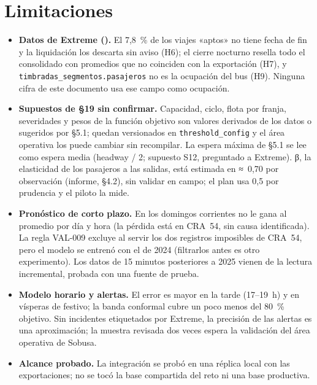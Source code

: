 \documentclass[10pt,a4paper]{article}
\begin{document}
\section{Limitaciones}
\begin{itemize}
\item \textbf{Datos de Extreme (\HallazgosRango).} El 7,8~\% de los viajes «aptos» no tiene fecha de fin y la liquidación los
  descarta sin aviso (H6); el cierre nocturno resella todo el consolidado con promedios que no coinciden con la
  exportación (H7), y \texttt{timbradas\_segmentos.pasajeros} no es la ocupación del bus (H9). Ninguna cifra de este
  documento usa ese campo como ocupación.
\item \textbf{Supuestos de §19 sin confirmar.} Capacidad, ciclo, flota por franja, severidades y pesos de la función
  objetivo son valores derivados de los datos o sugeridos por §5.1; quedan versionados en \texttt{threshold\_config} y
  el área operativa los puede cambiar sin recompilar. La espera máxima de §5.1 se lee como espera media (headway / 2;
  supuesto S12, preguntado a Extreme). β, la elasticidad de los pasajeros a las salidas, está estimada en ≈~0,70 por observación (informe, §4.2),
  sin validar en campo; el plan usa 0,5 por prudencia y el piloto la mide.
\item \textbf{Pronóstico de corto plazo.} En los domingos corrientes no le gana al promedio por día y hora (la pérdida
  está en CRA~54, sin causa identificada). La regla VAL-009 excluye al servir los dos registros imposibles de CRA~54,
  pero el modelo se entrenó con el de 2024 (filtrarlos antes es otro experimento). Los datos de 15 minutos posteriores
  a 2025 vienen de la lectura incremental, probada con una fuente de prueba.
\item \textbf{Modelo horario y alertas.} El error es mayor en la tarde (17–19~h) y en vísperas de festivo; la banda
  conformal cubre un poco menos del 80~\% objetivo. Sin incidentes etiquetados por Extreme, la precisión de las alertas es una
  aproximación; la muestra revisada dos veces espera la validación del área operativa de Sobusa.
\item \textbf{Alcance probado.} La integración se probó en una réplica local con las exportaciones; no se tocó la base
  compartida del reto ni una base productiva.
\end{itemize}
\end{document}

